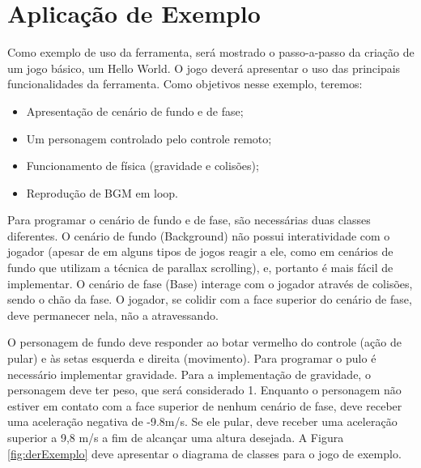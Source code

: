 \documentclass[
	12pt,				%
	openright,			%
	oneside,			%
	a4paper,			%
	brazil,				%
	]{abntex2}
\begin{document}
\section{Aplicação de Exemplo}

Como exemplo de uso da ferramenta, será mostrado o passo-a-passo da criação de um jogo básico, um Hello World. O jogo deverá apresentar o uso das principais funcionalidades da ferramenta. Como objetivos nesse exemplo, teremos:

\begin{itemize}
  \item Apresentação de cenário de fundo e de fase;
  \item Um personagem controlado pelo controle remoto;
  \item Funcionamento de física (gravidade e colisões);
  \item Reprodução de BGM em loop.
\end{itemize}

Para programar o cenário de fundo e de fase, são necessárias duas classes diferentes. O cenário de fundo (Background) não possui interatividade com o jogador (apesar de em alguns tipos de jogos reagir a ele, como em cenários de fundo que utilizam a técnica de parallax scrolling), e, portanto é mais fácil de implementar. O cenário de fase (Base) interage com o jogador através de colisões, sendo o chão da fase. O jogador, se colidir com a face superior do cenário de fase, deve permanecer nela, não a atravessando.

O personagem de fundo deve responder ao botar vermelho do controle (ação de pular) e às setas esquerda e direita (movimento). Para programar o pulo é necessário implementar gravidade. Para a implementação de gravidade, o personagem deve ter peso, que será considerado 1. Enquanto o personagem não estiver em contato com a face superior de nenhum cenário de fase, deve receber uma aceleração negativa de -9.8m/s. Se ele pular, deve receber uma aceleração superior a 9,8 m/s a fim de alcançar uma altura desejada. A Figura \ref{fig:derExemplo} deve apresentar o diagrama de classes para o jogo de exemplo.
\end{document}
